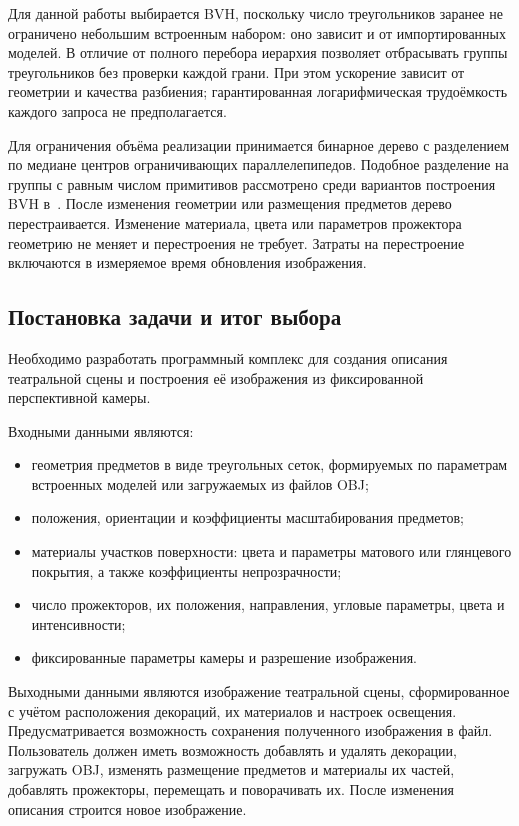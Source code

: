Для данной работы выбирается BVH, поскольку число треугольников заранее не ограничено небольшим встроенным набором: оно зависит и от импортированных моделей. В отличие от полного перебора иерархия позволяет отбрасывать группы треугольников без проверки каждой грани. При этом ускорение зависит от геометрии и качества разбиения; гарантированная логарифмическая трудоёмкость каждого запроса не предполагается.

Для ограничения объёма реализации принимается бинарное дерево с разделением по медиане центров ограничивающих параллелепипедов. Подобное разделение на группы с равным числом примитивов рассмотрено среди вариантов построения BVH в~\cite[разд.~7.3.1]{pbrt4}. После изменения геометрии или размещения предметов дерево перестраивается. Изменение материала, цвета или параметров прожектора геометрию не меняет и перестроения не требует. Затраты на перестроение включаются в измеряемое время обновления изображения.

\subsection{Постановка задачи и итог выбора}

Необходимо разработать программный комплекс для создания описания театральной сцены и построения её изображения из фиксированной перспективной камеры.

Входными данными являются:
\begin{itemize}
  \item геометрия предметов в виде треугольных сеток, формируемых по параметрам встроенных моделей или загружаемых из файлов OBJ;
  \item положения, ориентации и коэффициенты масштабирования предметов;
  \item материалы участков поверхности: цвета и параметры матового или глянцевого покрытия, а также коэффициенты непрозрачности;
  \item число прожекторов, их положения, направления, угловые параметры, цвета и интенсивности;
  \item фиксированные параметры камеры и разрешение изображения.
\end{itemize}

Выходными данными являются изображение театральной сцены, сформированное с учётом расположения декораций, их материалов и настроек освещения. Предусматривается возможность сохранения полученного изображения в файл. Пользователь должен иметь возможность добавлять и удалять декорации, загружать OBJ, изменять размещение предметов и материалы их частей, добавлять прожекторы, перемещать и поворачивать их. После изменения описания строится новое изображение.


